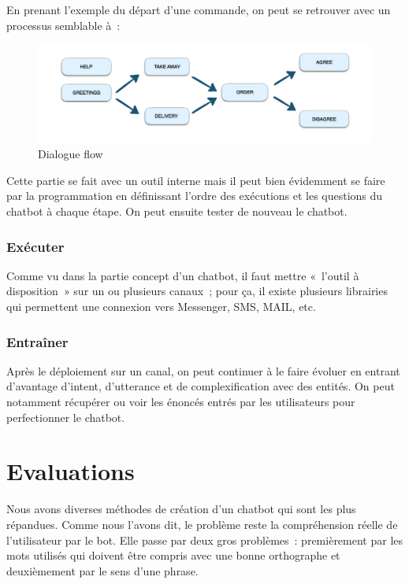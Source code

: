 	En prenant l’exemple du départ d’une commande, on peut se retrouver avec un processus semblable à :
\vspace{1em}

\begin{figure}[H]
	\centering
		\includegraphics[width = \textwidth]{construire.png}
	\caption{Dialogue flow}
	\label{fig:Dialogue flow}
\end{figure}
\vspace{1em}

Cette partie se fait avec un outil interne mais il peut bien évidemment se faire par la programmation en définissant l’ordre des exécutions et les questions du chatbot à chaque étape. On peut ensuite tester de nouveau  le chatbot.

\subsubsection{Exécuter}

Comme vu dans la partie concept d’un chatbot, il faut mettre « l’outil à disposition » sur un ou plusieurs canaux ;  pour ça, il existe plusieurs librairies qui permettent une connexion vers Messenger, SMS, MAIL, etc.

\subsubsection{Entraîner}

Après le déploiement sur un canal, on peut continuer à le faire évoluer en entrant d’avantage d’intent, d’utterance et de complexification avec des entités. On peut notamment récupérer ou voir les énoncés entrés par les utilisateurs pour perfectionner le chatbot.

\section{Evaluations}

Nous avons diverses méthodes de création d’un chatbot qui sont les plus répandues. Comme nous l’avons dit, le problème reste la compréhension réelle de l’utilisateur par le bot. Elle passe par deux gros problèmes : premièrement par les mots utilisés qui doivent être compris avec une bonne orthographe et deuxièmement par le sens d’une phrase.
\vspace{1em}

